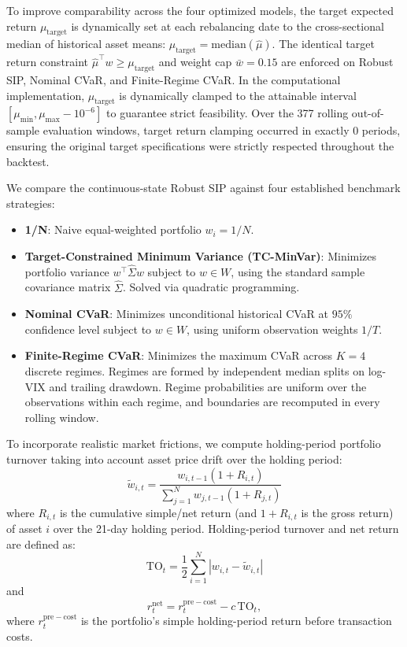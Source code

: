 \documentclass[smallextended]{svjour3}
\begin{document}
To improve comparability across the four optimized models, the target expected return $\mu_{\text{target}}$ is dynamically set at each rebalancing date to the cross-sectional median of historical asset means: $\mu_{\text{target}} = \text{median}(\hat{\mu})$. The identical target return constraint $\hat{\mu}^\top w \ge \mu_{\text{target}}$ and weight cap $\bar{w} = 0.15$ are enforced on Robust SIP, Nominal CVaR, and Finite-Regime CVaR. In the computational implementation, $\mu_{\text{target}}$ is dynamically clamped to the attainable interval $[\mu_{\min}, \mu_{\max} - 10^{-6}]$ to guarantee strict feasibility. Over the 377 rolling out-of-sample evaluation windows, target return clamping occurred in exactly 0 periods, ensuring the original target specifications were strictly respected throughout the backtest.

We compare the continuous-state Robust SIP against four established benchmark strategies:
\begin{itemize}
    \item \textbf{1/N}: Naive equal-weighted portfolio $w_i = 1/N$.
    \item \textbf{Target-Constrained Minimum Variance (TC-MinVar)}: Minimizes portfolio variance $w^\top \widehat{\Sigma} w$ subject to $w \in W$, using the standard sample covariance matrix $\widehat{\Sigma}$. Solved via quadratic programming.
    \item \textbf{Nominal CVaR}: Minimizes unconditional historical CVaR at $95\%$ confidence level subject to $w \in W$, using uniform observation weights $1/T$.
    \item \textbf{Finite-Regime CVaR}: Minimizes the maximum CVaR across $K=4$ discrete regimes. Regimes are formed by independent median splits on log-VIX and trailing drawdown. Regime probabilities are uniform over the observations within each regime, and boundaries are recomputed in every rolling window.
\end{itemize}

To incorporate realistic market frictions, we compute holding-period portfolio turnover taking into account asset price drift over the holding period:
\begin{equation}
    \widetilde w_{i,t} = \frac{w_{i,t-1}(1+R_{i,t})}{\sum_{j=1}^N w_{j,t-1}(1+R_{j,t})}
\end{equation}
where $R_{i,t}$ is the cumulative simple/net return (and $1+R_{i,t}$ is the gross return) of asset $i$ over the 21-day holding period. Holding-period turnover and net return are defined as:
\begin{equation}
    \text{TO}_t = \frac{1}{2} \sum_{i=1}^N | w_{i,t} - \widetilde w_{i,t} |
\end{equation}
and
\begin{equation}
    r_t^{\mathrm{net}} = r_t^{\mathrm{pre-cost}} - c\,\mathrm{TO}_t,
\end{equation}
where $r_t^{\mathrm{pre-cost}}$ is the portfolio's simple holding-period return before transaction costs.
\end{document}
